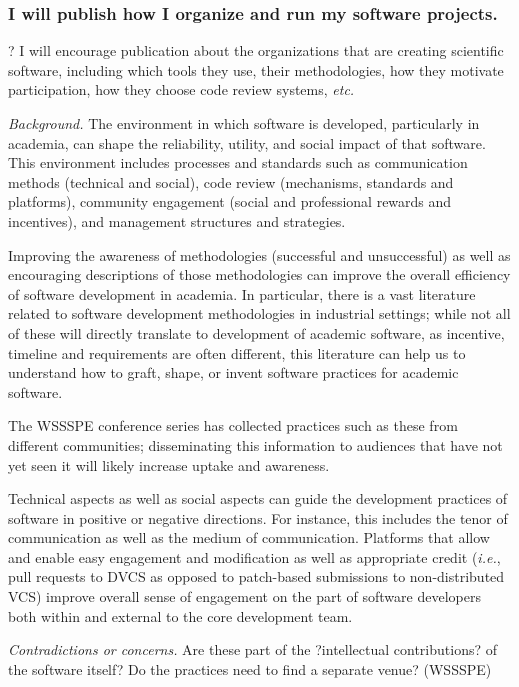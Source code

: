 \documentclass[a4paper,UKenglish]{dagman}
\renewcommand{\paragraph}[1]{\subsubsection*{#1}\xspace}
\newcommand{\ie}{\emph{i.e.},\xspace}
\newcommand{\etc}{\emph{etc.}\xspace}
\begin{document}

\paragraph{I will publish how I organize and run my software projects.}

?	I will encourage publication about the organizations that are creating scientific software, including which tools they use, their methodologies, how they motivate participation, how they choose code review systems, \etc

\emph{Background.} The environment in which software is developed, particularly in academia, can shape the reliability, utility, and social impact of that software.  This environment includes processes and standards such as communication methods (technical and social), code review (mechanisms, standards and platforms), community engagement (social and professional rewards and incentives), and management structures and strategies.

Improving the awareness of methodologies (successful and unsuccessful) as well as encouraging descriptions of those methodologies can improve the overall efficiency of software development in academia.  In particular, there is a vast literature related to software development methodologies in industrial settings; while not all of these will directly translate to development of academic software, as incentive, timeline and requirements are often different, this literature can help us to understand how to graft, shape, or invent software practices for academic software.

The WSSSPE conference series has collected practices such as these from different communities; disseminating this information to audiences that have not yet seen it will likely increase uptake and awareness.

Technical aspects as well as social aspects can guide the development practices of software in positive or negative directions.  For instance, this includes the tenor of communication as well as the medium of communication.  Platforms that allow and enable easy engagement and modification as well as appropriate credit (\ie pull requests to DVCS as opposed to patch-based submissions to non-distributed VCS) improve overall sense of engagement on the part of software developers both within and external to the core development team.

\emph{Contradictions or concerns.} Are these part of the ?intellectual contributions? of the software itself?  Do the practices need to find a separate venue?  (WSSSPE)
\end{document}
